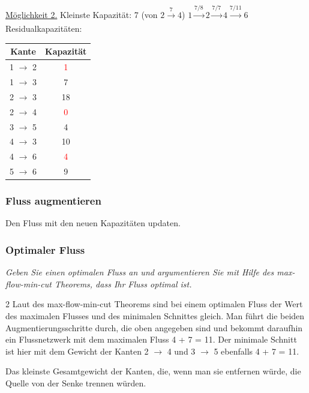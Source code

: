 \documentclass{article}
\begin{document}
\begin{minipage}{8cm}
\underline{Möglichkeit 2.} \newline
Kleinste Kapazität: 7 (von $2 \xrightarrow[]{7} 4$) \newline \newline
$ 1 \xrightarrow[]{7/8} 2 \xrightarrow[]{7/7} 4 \xrightarrow[]{7/11} 6 $ \newline
Residualkapazitäten: 
\begin{table}[H]
    \centering
    \begin{tabular}{c|c}
        \textbf{Kante} & \textbf{Kapazität}  \\ \hline
       1 $\rightarrow$ 2 & \textcolor{red}{1} \\
        1 $\rightarrow$ 3 & 7 \\
        2 $\rightarrow$ 3 & 18 \\
        2 $\rightarrow$ 4 & \textcolor{red}{0}  \\
        3 $\rightarrow$ 5 & 4 \\
        4 $\rightarrow$ 3 & 10 \\
        4 $\rightarrow$ 6 & \textcolor{red}{4} \\
        5 $\rightarrow$ 6 & 9 \\
    \end{tabular}
    \label{tab:res1}
\end{table}
\end{minipage}
\subsubsection*{Fluss augmentieren} 
Den Fluss mit den neuen Kapazitäten updaten. 

\subsubsection{Optimaler Fluss}
\textit{Geben Sie einen optimalen Fluss  an und argumentieren Sie mit Hilfe des max-flow-min-cut Theorems, dass Ihr Fluss optimal  ist. }\cite{probeklausur21}  \newline

\begin{multicols}{2}
\noindent
Laut des max-flow-min-cut Theorems sind bei einem optimalen Fluss der Wert des maximalen Flusses und des minimalen Schnittes gleich. \newline
Man führt die beiden Augmentierungsschritte durch, die oben angegeben sind und bekommt daraufhin ein Flussnetzwerk mit dem maximalen Fluss 4 + 7 = 11. \newline 
Der minimale Schnitt ist hier mit dem Gewicht der Kanten 2 $\rightarrow$ 4 und 3 $\rightarrow$ 5 ebenfalls 4 + 7 = 11. 
\begin{definitionbox}[title=Minimum Cut] 
Das kleinste Gesamtgewicht der Kanten, die, wenn man sie entfernen würde, die Quelle von der Senke trennen würden. \cite{wikimincutmaxflow}
\end{definitionbox}
\end{multicols}
\end{document}
